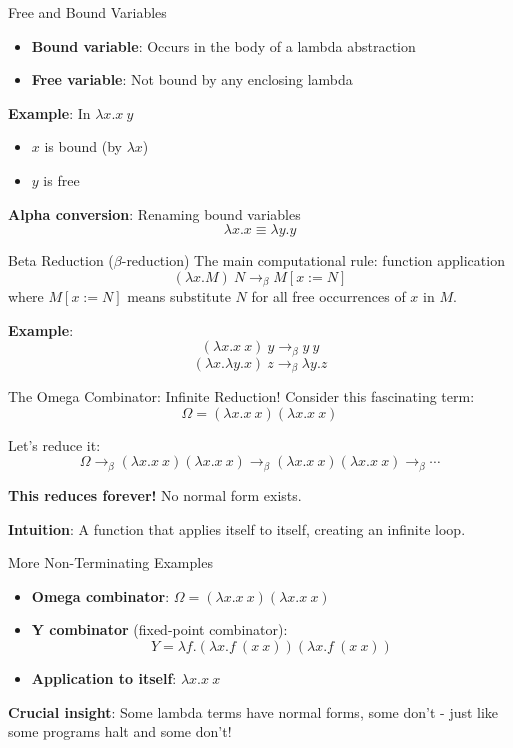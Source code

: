 \documentclass[10pt]{beamer}
\begin{document}
\begin{frame}{Free and Bound Variables}
\begin{itemize}
\item \textbf{Bound variable}: Occurs in the body of a lambda abstraction
\item \textbf{Free variable}: Not bound by any enclosing lambda
\end{itemize}

\vspace{0.3cm}
\textbf{Example}: In \(\lambda x.x\ y\)
\begin{itemize}
\item \(x\) is bound (by \(\lambda x\))
\item \(y\) is free
\end{itemize}

\vspace{0.3cm}
\textbf{Alpha conversion}: Renaming bound variables
\[
\lambda x.x \equiv \lambda y.y
\]
\end{frame}

\begin{frame}{Beta Reduction (\(\beta\)-reduction)}
The main computational rule: function application
\[
(\lambda x.M)\ N \rightarrow_\beta M[x := N]
\]
where \(M[x := N]\) means substitute \(N\) for all free occurrences of \(x\) in \(M\).

\vspace{0.3cm}
\textbf{Example}:
\[
(\lambda x.x\ x)\ y \rightarrow_\beta y\ y
\]
\[
(\lambda x.\lambda y.x)\ z \rightarrow_\beta \lambda y.z
\]
\end{frame}

\begin{frame}{The Omega Combinator: Infinite Reduction!}
Consider this fascinating term:
\[
\Omega = (\lambda x.x\ x)(\lambda x.x\ x)
\]

Let's reduce it:
\[
\Omega \rightarrow_\beta (\lambda x.x\ x)(\lambda x.x\ x) \rightarrow_\beta (\lambda x.x\ x)(\lambda x.x\ x) \rightarrow_\beta \cdots
\]

\vspace{0.3cm}
\textbf{This reduces forever!} No normal form exists.

\vspace{0.3cm}
\textbf{Intuition}: A function that applies itself to itself, creating an infinite loop.
\end{frame}

\begin{frame}{More Non-Terminating Examples}
\begin{itemize}
\item \textbf{Omega combinator}: \(\Omega = (\lambda x.x\ x)(\lambda x.x\ x)\)
\item \textbf{Y combinator} (fixed-point combinator):
\[
Y = \lambda f.(\lambda x.f\ (x\ x))(\lambda x.f\ (x\ x))
\]
\item \textbf{Application to itself}: \(\lambda x.x\ x\)
\end{itemize}

\vspace{0.3cm}
\textbf{Crucial insight}: Some lambda terms have normal forms, some don't - just like some programs halt and some don't!
\end{frame}
\end{document}
